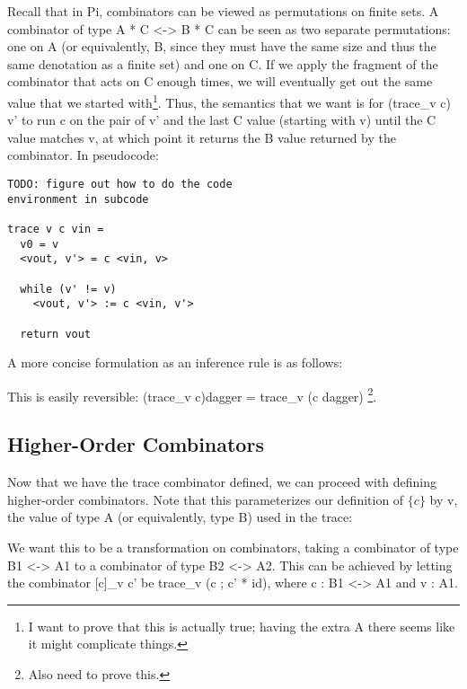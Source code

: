 \documentclass{sigplanconf}
\begin{document}
Recall that in {{Pi}}, combinators can be viewed as permutations on finite sets.
A combinator of type {{A * C <-> B * C}} can be seen as two separate
permutations: one on {{A}} (or equivalently, B, since they must have the same
size and thus the same denotation as a finite set) and one on {{C}}. If we
apply the fragment of the combinator that acts on {{C}} enough times, we will
eventually get out the same value that we started with\footnote{I want to prove
that this is actually true; having the extra {{A}} there seems like it might
complicate things.}. Thus, the semantics that we want is for {{(trace_v c) v'}}
to run {{c}} on the pair of {{v'}} and the last {{C}} value (starting with
{{v}}) until the {{C}} value matches {{v}}, at which point it returns the {{B}}
value returned by the combinator. In pseudocode:

\begin{verbatim}
TODO: figure out how to do the code 
environment in subcode

trace v c vin =
  v0 = v
  <vout, v'> = c <vin, v>

  while (v' != v)
    <vout, v'> := c <vin, v'>

  return vout
\end{verbatim}

A more concise formulation as an inference rule is as follows:


This is easily reversible: {{(trace_v c)dagger = trace_v (c dagger)}}
\footnote{Also need to prove this.}.

\subsection{Higher-Order Combinators}

Now that we have the trace combinator defined, we can proceed with defining
higher-order combinators. Note that this parameterizes our definition of
$\{c\}$ by {{v}}, the value of type {{A}} (or equivalently, type {{B}}) used
in the trace:


\noindent
We want this to be a transformation on combinators, taking a combinator of type
{{B1 <-> A1}} to a combinator of type {{B2 <-> A2}}. This can be achieved by
letting the combinator {{{[c]}_v c'}} be {{trace_v (c ; c' * id)}}, where
{{c : B1 <-> A1}} and {{v : A1}}.
\end{document}
